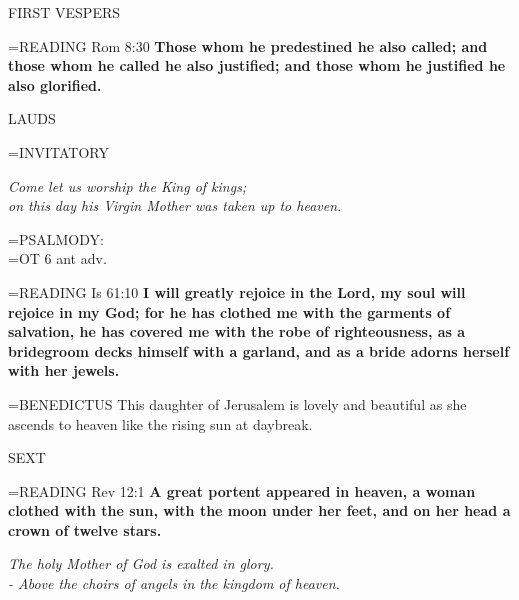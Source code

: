 \begin{flushleft}\normalsize FIRST VESPERS\\\end{flushleft}

\hangindent=\parindent \small{READING} Rom 8:30 \textbf{Those whom he predestined he also called; and
those whom he called he also justified; and those whom he justified
he also glorified.\\}
 
\begin{flushleft}\normalsize LAUDS\\\end{flushleft}

\hangindent=\parindent \small{INVITATORY}
\begin{center}
\textit{Come let us worship the King of kings;\\}
\textit{on this day his Virgin Mother was taken up to heaven.\\}
\end{center}

\hangindent=\parindent \small{PSALMODY:}\\
\hangindent=\parindent  OT 6 ant adv.\vspace{0.5em}

\hangindent=\parindent \small{READING} Is 61:10 \textbf{I will greatly rejoice in the Lord, my soul will rejoice
in my God; for he has clothed me with the garments of salvation,
he has covered me with the robe of righteousness, as a bridegroom
decks himself with a garland, and as a bride adorns herself with her
jewels.\\}
 
\hangindent=\parindent \small{BENEDICTUS  This daughter of Jerusalem is lovely and beautiful as she
ascends to heaven like the rising sun at daybreak.\\}
 
\begin{flushleft}\normalsize SEXT\\\end{flushleft}

\hangindent=\parindent \small{READING} Rev 12:1 \textbf{A great portent appeared in heaven, a woman
clothed with the sun, with the moon under her feet, and on her
head a crown of twelve stars.}
 
\begin{center}
\textit{The holy Mother of God is exalted in glory.\\
- Above the choirs of angels in the kingdom of heaven.}
\end{center}

